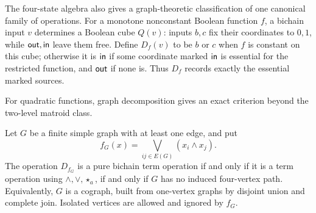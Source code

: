 The four-state algebra also gives a graph-theoretic classification of one
canonical family of operations. For a monotone nonconstant Boolean function
$f$, a bichain input $v$ determines a Boolean cube $Q(v)$: inputs $b,c$ fix
their coordinates to $0,1$, while $\mathsf{out},\mathsf{in}$ leave them free.
Define $D_f(v)$ to be $b$ or $c$ when $f$ is constant on this cube;
otherwise it is $\mathsf{in}$ if some coordinate marked $\mathsf{in}$ is
essential for the restricted function, and $\mathsf{out}$ if none is.
Thus $D_f$ records exactly the essential marked sources.



For quadratic functions, graph decomposition gives an exact criterion
beyond the two-level matroid class.

\begin{theorem}\label{core:thm:cograph-extension}
Let $G$ be a finite simple graph with at least one edge, and put
\[
 f_G(x)=\bigvee_{ij\in E(G)}(x_i\land x_j).
\]
The operation $D_{f_G}$ is a pure bichain term operation if and only if
it is a term operation using $\wedge,\vee,\star_a$, if and only if $G$
has no induced four-vertex path. Equivalently, $G$ is a cograph, built
from one-vertex graphs by disjoint union and complete join. Isolated
vertices are allowed and ignored by $f_G$.
\end{theorem}
